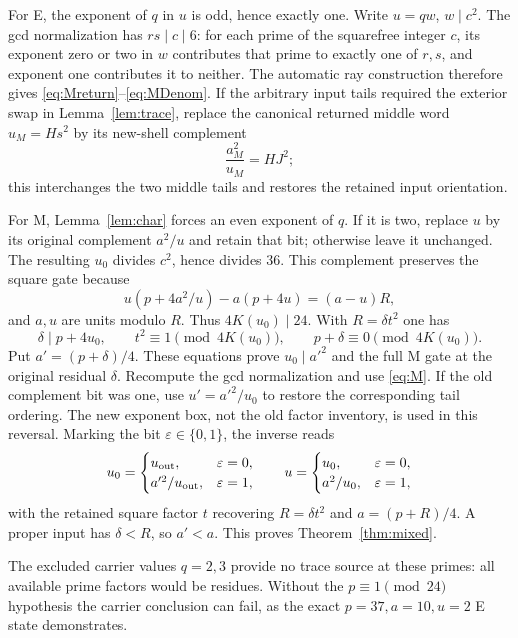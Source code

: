 For E, the exponent of $q$ in $u$ is odd, hence exactly one. Write
$u=qw$, $w\mid c^2$. The gcd normalization has $rs\mid c\mid6$:
for each prime of the squarefree integer $c$, its exponent zero or two in $w$
contributes that prime to exactly one of $r,s$, and exponent one contributes
 it to neither. The automatic ray construction therefore gives
\eqref{eq:Mreturn}--\eqref{eq:MDenom}. If the arbitrary input tails required
the exterior swap in Lemma~\ref{lem:trace}, replace the canonical returned
middle word \(u_M=Hs^2\) by its new-shell complement
\[
 \frac{a_M^2}{u_M}=HJ^2;
\]
this interchanges the two middle tails and restores the retained input
orientation.

For M, Lemma~\ref{lem:char} forces an even exponent of $q$. If it is two,
replace $u$ by its original complement $a^2/u$ and retain that bit; otherwise
leave it unchanged. The resulting $u_0$ divides $c^2$, hence divides $36$.
This complement preserves the square gate because
\[
 u\left(p+4a^2/u\right)-a(p+4u)=(a-u)R,
\]
and \(a,u\) are units modulo \(R\). Thus $4K(u_0)\mid24$. With
$R=\delta t^2$ one has
\[
 \delta\mid p+4u_0,\qquad
 t^2\equiv1\pmod{4K(u_0)},\qquad
 p+\delta\equiv0\pmod{4K(u_0)}.
\]
Put $a'=(p+\delta)/4$. These equations prove $u_0\mid a'^2$ and the full M
gate at the original residual $\delta$. Recompute the gcd normalization and
use \eqref{eq:M}. If the old complement bit was one, use $u'=a'^2/u_0$ to
restore the corresponding tail ordering. The new exponent box, not the old
factor inventory, is used in this reversal. Marking the bit
\(\varepsilon\in\{0,1\}\), the inverse reads
\[
 u_0=\begin{cases}u_{\rm out},&\varepsilon=0,\\
 a'^2/u_{\rm out},&\varepsilon=1,\end{cases}
 \qquad
 u=\begin{cases}u_0,&\varepsilon=0,\\
 a^2/u_0,&\varepsilon=1,\end{cases}
\]
with the retained square factor \(t\) recovering \(R=\delta t^2\) and
\(a=(p+R)/4\). A proper input has $\delta<R$,
so $a'<a$. This proves Theorem~\ref{thm:mixed}.

The excluded carrier values $q=2,3$ provide no trace source at these primes:
all available prime factors would be residues. Without the $p\equiv1\pmod{24}$
hypothesis the carrier conclusion can fail, as the exact $p=37,a=10,u=2$ E
state demonstrates.

